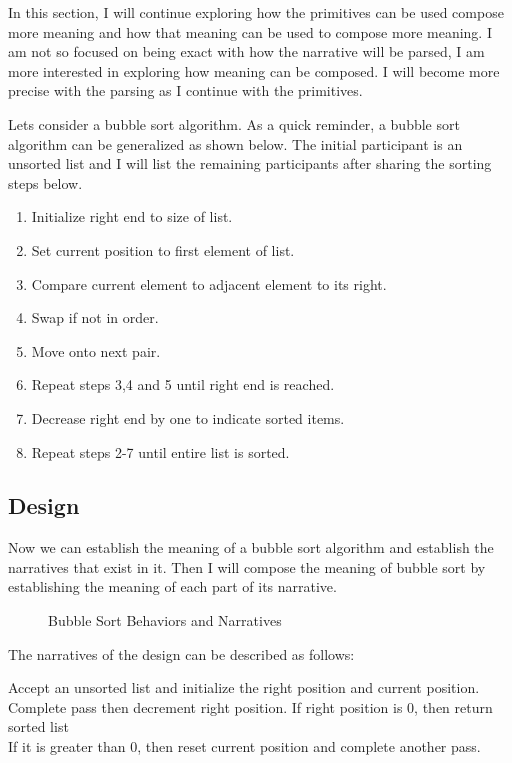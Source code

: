 In this section, I will continue exploring how the primitives can be used compose more meaning and how that meaning can be used to compose more meaning. I am not so focused on being exact with how the narrative will be parsed, I am more interested in exploring how meaning can be composed. I will become more precise with the parsing as I continue with the primitives.

Lets consider a bubble sort algorithm. As a quick reminder, a bubble sort algorithm can be generalized as shown below. The initial participant is an unsorted list and I will list the remaining participants after sharing the sorting steps below.

\begin{enumerate}[noitemsep]
    \item Initialize right end to size of list.
    \item Set current position to first element of list. 
    \item Compare current element to adjacent element to its right.
    \item Swap if not in order.
    \item Move onto next pair.
    \item Repeat steps 3,4 and 5 until right end is reached.
    \item Decrease right end by one to indicate sorted items.
    \item Repeat steps 2-7 until entire list is sorted.
\end{enumerate}

\subsection{Design}

Now we can establish the meaning of a bubble sort algorithm and establish the narratives that exist in it. Then I will compose the meaning of bubble sort by establishing the meaning of each part of its narrative.

\begin{figure}[htbp]
    \centering
    
    \caption{Bubble Sort Behaviors and Narratives}
    \label{fig:bubble_srt}
\end{figure}

The narratives of the design can be described as follows:
\begin{greyquote}
Accept an unsorted list and initialize the right position and current position.\\
Complete pass then decrement right position. 
If right position is 0, then return sorted list \\
If it is greater than 0, then reset current position and complete another pass.\\
\end{greyquote}



